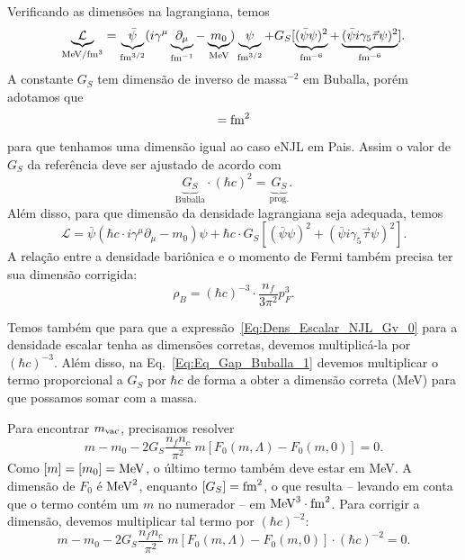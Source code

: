 Verificando as dimensões na lagrangiana, temos
\begin{equation}
	\underbrace{\mathcal{L}}_{\mathcal{\rm{MeV}/\rm{fm}^3}} = \underbrace{\bar{\psi}}_{\rm{fm}^{3/2}}(i\gamma^\mu\underbrace{\partial_\mu}_{\rm{fm}^{-1}} - \underbrace{m_0}_{\rm{MeV}})\underbrace{\psi}_{\rm{fm}^{3/2}} + G_S [ \underbrace{(\bar{\psi}\psi)^2}_{\rm{fm}^{-6}} + \underbrace{(\bar{\psi}i\gamma_5\vec{\tau}\psi)^2}_{\rm{fm}^{-6}}].
\end{equation}
%
A constante $G_S$ tem dimensão de inverso de massa$^{-2}$ em Buballa\cite{Buballa1996}, porém adotamos que 
\begin{equation}
	[G_S] = \rm{fm}^{2}
\end{equation}
%
para que tenhamos uma dimensão igual ao caso eNJL em Pais\cite{Pais}. Assim o valor de $G_S$ da referência deve ser ajustado de acordo com
\begin{equation}
	\underbrace{G_S}_{\textrm{Buballa}} \cdot (\hbar c)^2 = \underbrace{G_S}_{\textrm{prog.}}.
\end{equation}
%
Além disso, para que dimensão da densidade lagrangiana seja adequada, temos
\begin{equation}
	\mathcal{L} = \bar{\psi}(\hbar c \cdot i\gamma^\mu\partial_\mu - m_0)\psi + \hbar c \cdot G_S[(\bar{\psi}\psi)^2 + (\bar{\psi}i\gamma_5\vec{\tau}\psi)^2].
\end{equation}
%
A relação entre a densidade bariônica e o momento de Fermi também precisa ter sua dimensão corrigida:
\begin{equation}
	\rho_B = (\hbar c)^{-3} \cdot \frac{n_f}{3\pi^2}p_F^3.
\end{equation}

Temos também que para que a expressão~\eqref{Eq:Dens_Escalar_NJL_Gv_0} para a densidade escalar tenha as dimensões corretas, devemos multiplicá-la por $(\hbar c)^{-3}$. Além disso, na Eq.~\eqref{Eq:Eq_Gap_Buballa_1} devemos multiplicar o termo proporcional a $G_S$ por $\hbar c$ de forma a obter a dimensão correta (MeV) para que possamos somar com a massa.

Para encontrar $m_{\rm{vac}}$, precisamos resolver
\begin{equation}
	m - m_0 - 2G_S\frac{n_f n_c}{\pi^2} \;m [F_0(m, \Lambda) - F_0(m,0)] = 0.
\end{equation}
%
Como $[m] = [m_0] = \rm{MeV}$, o último termo também deve estar em MeV. A dimensão de $F_0$ é $\rm{MeV}^2$, enquanto $[G_S] = \rm{fm}^2$, o que resulta -- levando em conta que o termo contém um $m$ no numerador -- em $\rm{MeV}^3\cdot\rm{fm}^2$. Para corrigir a dimensão, devemos multiplicar tal termo por $(\hbar c)^{-2}$:
\begin{equation}
	m - m_0 - 2G_S\frac{n_f n_c}{\pi^2} \;m [F_0(m, \Lambda) - F_0(m,0)] \cdot (\hbar c)^{-2} = 0.
\end{equation}

